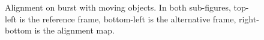 \documentclass[conference, 10pt]{IEEEtran}
\begin{document}
\begin{figure}[tb]
\centering
{}
\newline
{}
\caption{Alignment on burst with moving objects. In both sub-figures, top-left
is the reference frame, bottom-left is the alternative frame, right-bottom is the
alignment map.}
\label{img::aligns}
\end{figure}
\end{document}
